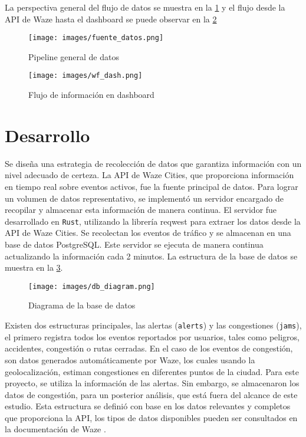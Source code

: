 \documentclass[12pt]{article}
\begin{document}
La perspectiva general del flujo de datos se muestra en la \cref{fig:fuente} y el flujo desde la API de Waze hasta el dashboard se puede observar en la \cref{fig:wf_dash}

\begin{figure}[H]
    \centering
    \texttt{[image: images/fuente\_datos.png]}
    \caption{Pipeline general de datos}
    \label{fig:fuente}
\end{figure}

\begin{figure}[H]
    \centering
    \texttt{[image: images/wf\_dash.png]}
    \caption{Flujo de información en dashboard}
    \label{fig:wf_dash}
\end{figure}

\section{Desarrollo}

Se diseña una estrategia de recolección de datos que garantiza información con un nivel adecuado de certeza. La API de Waze Cities, que proporciona información en tiempo real sobre eventos activos, fue la fuente principal de datos. Para lograr un volumen de datos representativo, se implementó un servidor encargado de recopilar y almacenar esta información de manera continua. El servidor fue desarrollado en \texttt{Rust}, utilizando la librería reqwest \citep{reqwest2025} para extraer los datos desde la API de Waze Cities. Se recolectan los eventos de tráfico y se almacenan en una base de datos PostgreSQL. Este servidor se ejecuta de manera continua actualizando la información cada 2 minutos. La estructura de la base de datos se muestra en la \cref{fig:db_diagram}.

\begin{figure}[H]
    \centering
    \texttt{[image: images/db\_diagram.png]}
    \caption{Diagrama de la base de datos}
    \label{fig:db_diagram}
\end{figure}

Existen dos estructuras principales, las alertas (\texttt{alerts}) y las congestiones (\texttt{jams}), el primero registra todos los eventos reportados por usuarios, tales como peligros, accidentes, congestión o rutas cerradas. En el caso de los eventos de congestión, son datos generados automáticamente por Waze, los cuales usando la geolocalización, estiman congestiones en diferentes puntos de la ciudad. Para este proyecto, se utiliza la información de las alertas. Sin embargo, se almacenaron los datos de congestión, para un posterior análisis, que está fuera del alcance de este estudio. Esta estructura se definió con base en los datos relevantes y completos que proporciona la API, los tipos de datos disponibles pueden ser consultados en la documentación de Waze \citep{waze2024}.
\end{document}
